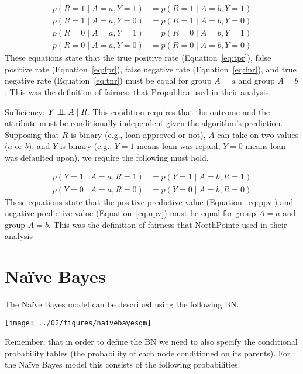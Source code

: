 \documentclass{tufte-handout}
\begin{document}
\begin{align}
p(R=1 \mid A=a, Y=1) &= p(R=1 \mid A=b, Y=1) \label{eq:tpr} \\
p(R=1 \mid A=a, Y=0) &= p(R=1 \mid A=b, Y=0) \label{eq:fpr} \\
p(R=0 \mid A=a, Y=1) &= p(R=0 \mid A=b, Y=1) \label{eq:fnr} \\
p(R=0 \mid A=a, Y=0) &= p(R=0 \mid A=b, Y=0) \label{eq:tnr}
\end{align}
These equations state that the true positive rate (Equation~\ref{eq:tpr}), false positive rate (Equation~\ref{eq:fpr}), false negative rate (Equation~\ref{eq:fnr}), and true negative rate (Equation~\ref{eq:tnr}) must be equal for group $A=a$ and group $A=b$.  This was the definition of fairness that Propublica used in their analysis.

\item Sufficiency: $Y \perp\!\!\!\perp A\mid R$.  This condition requires that the outcome and the attribute must be conditionally independent given the algorithm's prediction.   Supposing that $R$ is binary (e.g., loan approved or not), $A$ can take on two values ($a$ or $b$), and $Y$ is binary (e.g., $Y=1$ means loan was repaid, $Y=0$ means loan was defaulted upon), we require the following must hold.

\begin{align}
p(Y=1 \mid A=a, R=1) &= p(Y=1 \mid A=b, R=1) \label{eq:ppv} \\
p(Y=0 \mid A=a, R=0) &= p(Y=0 \mid A=b, R=0) \label{eq:npv}
\end{align}
These equations state that the positive predictive value (Equation~\ref{eq:ppv}) and negative predictive value (Equation~\ref{eq:npv}) must be equal for group $A=a$ and group $A=b$.  This was the definition of fairness that NorthPointe used in their analysis
\ei

\section{Na\"ive Bayes}

The Na\"ive Bayes model can be described using the following BN.

\begin{center}
\texttt{[image: ../02/figures/naivebayesgm]}
\end{center}

Remember, that in order to define the BN we need to also specify the conditional probability tables (the probability of each node conditioned on its parents).  For the Na\"ive Bayes model this consists of the following probabilities.
\end{document}
